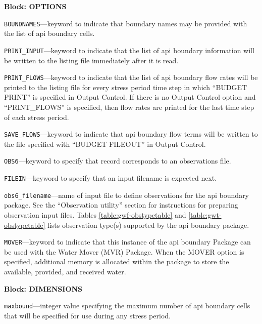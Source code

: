 
\item \textbf{Block: OPTIONS}

\begin{description}
\item \texttt{BOUNDNAMES}---keyword to indicate that boundary names may be provided with the list of api boundary cells.

\item \texttt{PRINT\_INPUT}---keyword to indicate that the list of api boundary information will be written to the listing file immediately after it is read.

\item \texttt{PRINT\_FLOWS}---keyword to indicate that the list of api boundary flow rates will be printed to the listing file for every stress period time step in which ``BUDGET PRINT'' is specified in Output Control.  If there is no Output Control option and ``PRINT\_FLOWS'' is specified, then flow rates are printed for the last time step of each stress period.

\item \texttt{SAVE\_FLOWS}---keyword to indicate that api boundary flow terms will be written to the file specified with ``BUDGET FILEOUT'' in Output Control.

\item \texttt{OBS6}---keyword to specify that record corresponds to an observations file.

\item \texttt{FILEIN}---keyword to specify that an input filename is expected next.

\item \texttt{obs6\_filename}---name of input file to define observations for the api boundary package. See the ``Observation utility'' section for instructions for preparing observation input files. Tables \ref{table:gwf-obstypetable} and \ref{table:gwt-obstypetable} lists observation type(s) supported by the api boundary package.

\item \texttt{MOVER}---keyword to indicate that this instance of the api boundary Package can be used with the Water Mover (MVR) Package.  When the MOVER option is specified, additional memory is allocated within the package to store the available, provided, and received water.

\end{description}
\item \textbf{Block: DIMENSIONS}

\begin{description}
\item \texttt{maxbound}---integer value specifying the maximum number of api boundary cells that will be specified for use during any stress period.

\end{description}

